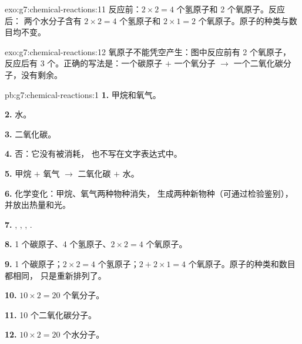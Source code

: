 \begin{solution}{exo:g7:chemical-reactions:11}
反应前：$2 \times 2 = 4$ 个氢原子和 2 个氧原子。反应后：
两个水分子含有 $2 \times 2 = 4$ 个氢原子和 $2 \times 1 =
2$ 个氧原子。原子的种类与数目均不变。
\end{solution}

\begin{solution}{exo:g7:chemical-reactions:12}
氧原子不能凭空产生：图中反应前有 2 个氧原子，
反应后有 3 个。正确的写法是：一个碳原子 $+$ 一个氧分子
$\longrightarrow$ 一个二氧化碳分子，没有剩余。
\end{solution}

\begin{solution}{pb:g7:chemical-reactions:1}
\textbf{1.} 甲烷和氧气。

\textbf{2.} 水。

\textbf{3.} 二氧化碳。

\textbf{4.} 否：它没有被消耗，
也不写在文字表达式中。

\textbf{5.} 甲烷 $+$ 氧气 $\longrightarrow$ 二氧化碳 $+$
水。

\textbf{6.} 化学变化：甲烷、氧气两种物种消失，
生成两种新物种（可通过检验鉴别），并放出热量和光。

\textbf{7.} , , , .

\textbf{8.} 1 个碳原子、4 个氢原子、$2 \times 2 = 4$ 个氧原子。

\textbf{9.} 1 个碳原子；$2 \times 2 = 4$ 个氢原子；$2 + 2 \times 1 = 4$
个氧原子。原子的种类和数目都相同，
只是重新排列了。

\textbf{10.} $10 \times 2 = 20$ 个氧分子。

\textbf{11.} 10 个二氧化碳分子。

\textbf{12.} $10 \times 2 = 20$ 个水分子。
\end{solution}
